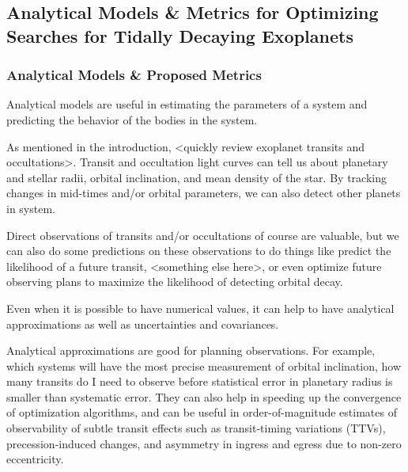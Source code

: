 \documentclass[oneside,12pt]{amsart}
\numberwithin{page}{section}
\begin{document}




\subsection{Analytical Models \& Metrics for Optimizing Searches for Tidally Decaying Exoplanets}\label{sec:models}

\subsubsection{Analytical Models \& Proposed Metrics}

Analytical models are useful in estimating the parameters of a system and predicting the behavior of the bodies in the system. 

As mentioned in the introduction, <quickly review exoplanet transits and occultations>. Transit and occultation light curves can tell us about planetary and stellar radii, orbital inclination, and mean density of the star. By tracking changes in mid-times and/or orbital parameters, we can also detect other planets in system.

Direct observations of transits and/or occultations of course are valuable, but we can also do some predictions on these observations to do things like predict the likelihood of a future transit, <something else here>, or even optimize future observing plans to maximize the likelihood of detecting orbital decay. 

Even when it is possible to have numerical values, it can help to have analytical approximations as well as uncertainties and covariances. 

Analytical approximations are good for planning observations. For example, which systems will have the most precise measurement of orbital inclination, how many transits do I need to observe before statistical error in planetary radius is smaller than systematic error. They can also help in speeding up the convergence of optimization algorithms, and can be useful in order-of-magnitude estimates of observability of subtle transit effects such as transit-timing variations (TTVs), precession-induced changes, and asymmetry in ingress and egress due to non-zero eccentricity.
\end{document}
